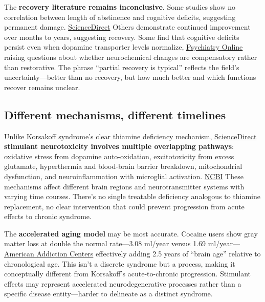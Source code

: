 The \textbf{recovery literature remains inconclusive}. Some studies show no correlation between length of abstinence and cognitive deficits, suggesting permanent damage. \href{https://www.sciencedirect.com/science/article/pii/S088761770300043X}{ScienceDirect} Others demonstrate continued improvement over months to years, suggesting recovery. Some find that cognitive deficits persist even when dopamine transporter levels normalize, \href{https://psychiatryonline.org/doi/full/10.1176/jnp.15.3.317}{Psychiatry Online} raising questions about whether neurochemical changes are compensatory rather than restorative. The phrase ``partial recovery is typical'' reflects the field's uncertainty---better than no recovery, but how much better and which functions recover remains unclear.

\subsection{Different mechanisms, different timelines}\label{16_missing_syndrome-different-mechanisms-different-timelines}

Unlike Korsakoff syndrome's clear thiamine deficiency mechanism, \href{https://www.sciencedirect.com/topics/biochemistry-genetics-and-molecular-biology/korsakoffs-syndrome}{ScienceDirect} \textbf{stimulant neurotoxicity involves multiple overlapping pathways}: oxidative stress from dopamine auto-oxidation, excitotoxicity from excess glutamate, hyperthermia and blood-brain barrier breakdown, mitochondrial dysfunction, and neuroinflammation with microglial activation. \href{https://www.ncbi.nlm.nih.gov/books/NBK537204/}{NCBI} These mechanisms affect different brain regions and neurotransmitter systems with varying time courses. There's no single treatable deficiency analogous to thiamine replacement, no clear intervention that could prevent progression from acute effects to chronic syndrome.

The \textbf{accelerated aging model} may be most accurate. Cocaine users show gray matter loss at double the normal rate---3.08 ml/year versus 1.69 ml/year--- \href{https://americanaddictioncenters.org/stimulants/cocaine/effects-on-the-brain}{American Addiction Centers} effectively adding 2.5 years of ``brain age'' relative to chronological age. This isn't a discrete syndrome but a process, making it conceptually different from Korsakoff's acute-to-chronic progression. Stimulant effects may represent accelerated neurodegenerative processes rather than a specific disease entity---harder to delineate as a distinct syndrome.

